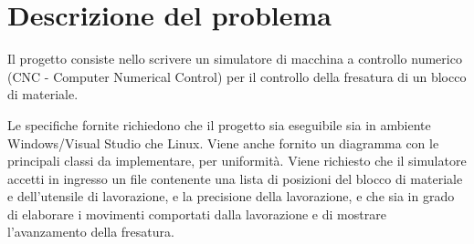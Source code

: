 \section{Descrizione del problema}
Il progetto consiste nello scrivere un simulatore di macchina a controllo numerico (CNC - Computer Numerical Control) per il controllo della fresatura di un blocco di materiale.

Le specifiche fornite richiedono che il progetto sia eseguibile sia in ambiente Windows/Visual Studio che Linux. Viene anche fornito un diagramma con le principali classi da implementare, per uniformità. Viene richiesto che il simulatore accetti in ingresso un file contenente una lista di posizioni del blocco di materiale e dell'utensile di lavorazione, e la precisione della lavorazione, e che sia in grado di elaborare i movimenti comportati dalla lavorazione e di mostrare l'avanzamento della fresatura.

